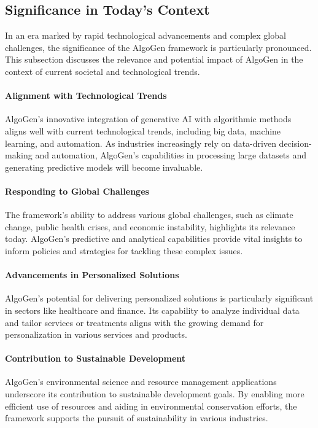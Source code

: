 \documentclass{article}
\begin{document}
\subsection{Significance in Today's Context}
In an era marked by rapid technological advancements and complex global challenges, the significance of the AlgoGen framework is particularly pronounced. This subsection discusses the relevance and potential impact of AlgoGen in the context of current societal and technological trends.

\paragraph{Alignment with Technological Trends}
AlgoGen's innovative integration of generative AI with algorithmic methods aligns well with current technological trends, including big data, machine learning, and automation. As industries increasingly rely on data-driven decision-making and automation, AlgoGen’s capabilities in processing large datasets and generating predictive models will become invaluable.

\paragraph{Responding to Global Challenges}
The framework's ability to address various global challenges, such as climate change, public health crises, and economic instability, highlights its relevance today. AlgoGen’s predictive and analytical capabilities provide vital insights to inform policies and strategies for tackling these complex issues.

\paragraph{Advancements in Personalized Solutions}
AlgoGen’s potential for delivering personalized solutions is particularly significant in sectors like healthcare and finance. Its capability to analyze individual data and tailor services or treatments aligns with the growing demand for personalization in various services and products.

\paragraph{Contribution to Sustainable Development}
AlgoGen's environmental science and resource management applications underscore its contribution to sustainable development goals. By enabling more efficient use of resources and aiding in environmental conservation efforts, the framework supports the pursuit of sustainability in various industries.
\end{document}
